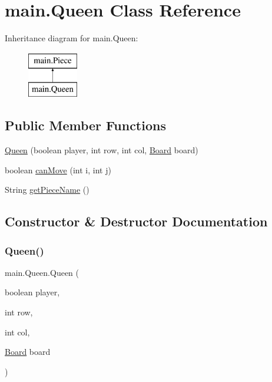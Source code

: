 \hypertarget{classmain_1_1_queen}{}\section{main.\+Queen Class Reference}
\label{classmain_1_1_queen}
Inheritance diagram for main.\+Queen\+:\begin{figure}[H]
\begin{center}
\leavevmode
\includegraphics[height=2.000000cm]{classmain_1_1_queen}
\end{center}
\end{figure}
\subsection*{Public Member Functions}
\begin{DoxyCompactItemize}
\item 
\mbox{\hyperlink{classmain_1_1_queen_ad216869c0b9804e598b4ba5a18362648}{Queen}} (boolean player, int row, int col, \mbox{\hyperlink{classmain_1_1_board}{Board}} board)
\item 
boolean \mbox{\hyperlink{classmain_1_1_queen_af97cabf8dd28d4435faa4a26bc8625d7}{can\+Move}} (int i, int j)
\item 
String \mbox{\hyperlink{classmain_1_1_queen_a913eb8ceb0191b10a35eb9a5034aae01}{get\+Piece\+Name}} ()
\end{DoxyCompactItemize}


\subsection{Constructor \& Destructor Documentation}
\mbox{\label{classmain_1_1_queen_ad216869c0b9804e598b4ba5a18362648}} 
\subsubsection{\texorpdfstring{Queen()}{Queen()}}
{\footnotesize\ttfamily main.\+Queen.\+Queen (\begin{DoxyParamCaption}\item[{boolean}]{player,  }\item[{int}]{row,  }\item[{int}]{col,  }\item[{\mbox{\hyperlink{classmain_1_1_board}{Board}}}]{board }\end{DoxyParamCaption})\hspace{0.3cm}{\ttfamily [inline]}}

